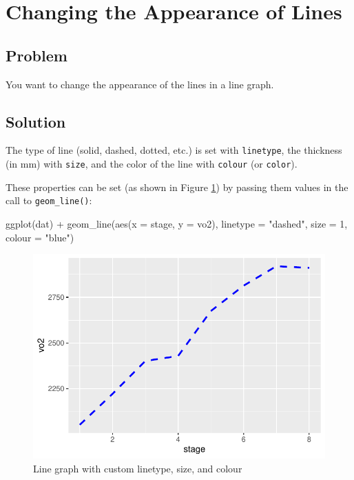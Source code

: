 \documentclass[
]{book}
\newenvironment{Shaded}{\begin{snugshade}}{\end{snugshade}}
\newcommand{\AttributeTok}[1]{\textcolor[rgb]{0.77,0.63,0.00}{#1}}
\newcommand{\DecValTok}[1]{\textcolor[rgb]{0.00,0.00,0.81}{#1}}
\newcommand{\FunctionTok}[1]{\textcolor[rgb]{0.00,0.00,0.00}{#1}}
\newcommand{\NormalTok}[1]{#1}
\newcommand{\SpecialCharTok}[1]{\textcolor[rgb]{0.00,0.00,0.00}{#1}}
\newcommand{\StringTok}[1]{\textcolor[rgb]{0.31,0.60,0.02}{#1}}
\begin{document}
\hypertarget{LINE-GRAPH-LINE-APPEARANCE}{%
\section{Changing the Appearance of Lines}\label{LINE-GRAPH-LINE-APPEARANCE}}

\hypertarget{problem-24}{%
\subsection{Problem}\label{problem-24}}

You want to change the appearance of the lines in a line graph.

\hypertarget{solution-24}{%
\subsection{Solution}\label{solution-24}}

The type of line (solid, dashed, dotted, etc.) is set with \texttt{linetype}, the thickness (in mm) with \texttt{size}, and the color of the line with \texttt{colour} (or \texttt{color}).

These properties can be set (as shown in Figure \ref{fig:FIG-BAR-GRAPH-BASIC-LINE-CUSTOMIZED}) by passing them values in the call to \texttt{geom\_line()}:

\begin{Shaded}
\begin{Highlighting}[]
\FunctionTok{ggplot}\NormalTok{(dat) }\SpecialCharTok{+}
  \FunctionTok{geom\_line}\NormalTok{(}\FunctionTok{aes}\NormalTok{(}\AttributeTok{x =}\NormalTok{ stage, }\AttributeTok{y =}\NormalTok{ vo2), }
            \AttributeTok{linetype =} \StringTok{"dashed"}\NormalTok{, }\AttributeTok{size =} \DecValTok{1}\NormalTok{, }\AttributeTok{colour =} \StringTok{"blue"}\NormalTok{)}
\end{Highlighting}
\end{Shaded}

\begin{figure}

{\centering \includegraphics[width=0.5\linewidth]{se201_stats_book_files/figure-latex/FIG-BAR-GRAPH-BASIC-LINE-CUSTOMIZED-1} 

}

\caption[Line graph with custom linetype, size, and colour]{Line graph with custom linetype, size, and colour}\label{fig:FIG-BAR-GRAPH-BASIC-LINE-CUSTOMIZED}
\end{figure}
\end{document}
